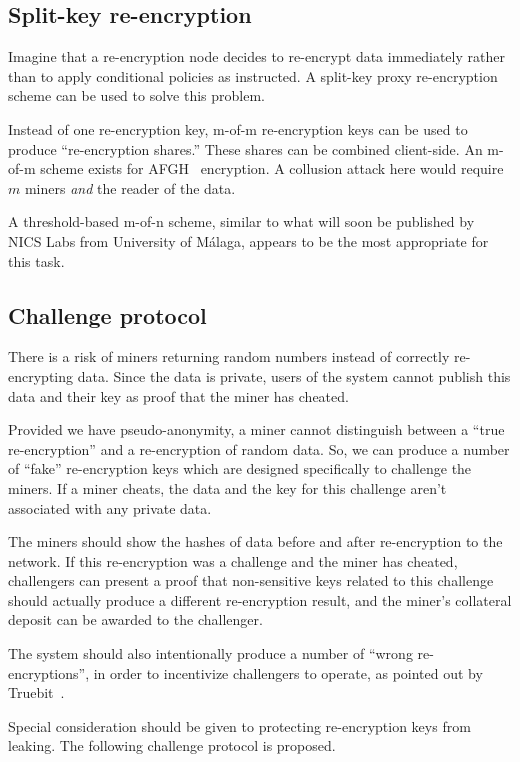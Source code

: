 \documentclass[longbibliography,nofootinbib]{revtex4-1}
\begin{document}
\subsection{Split-key re-encryption}

Imagine that a re-encryption node decides to re-encrypt data immediately rather than to apply conditional policies as instructed.
A split-key proxy re-encryption scheme can be used to solve this problem.

Instead of one re-encryption key, m-of-m re-encryption keys can be used to produce ``re-encryption shares.''
These shares can be combined client-side.
An m-of-m scheme exists for AFGH~\cite{AFGH} encryption.
A collusion attack here would require $m$ miners \emph{and} the reader of the data.

A threshold-based m-of-n scheme, similar to what will soon be published by NICS Labs from University of M{\'a}laga, appears to be the most appropriate for this task.

\subsection{Challenge protocol}
\label{sec:challenge-protocol}

There is a risk of miners returning random numbers instead of correctly re-encrypting data.
Since the data is private, users of the system cannot publish this data and their key as proof that the miner has cheated.

Provided we have pseudo-anonymity, a miner cannot distinguish between a ``true re-encryption'' and a re-encryption of random data.
So, we can produce a number of ``fake'' re-encryption keys which are designed specifically to challenge the miners.
If a miner cheats, the data and the key for this challenge aren't associated with any private data.

The miners should show the hashes of data before and after re-encryption to the network.
If this re-encryption was a challenge and the miner has cheated, challengers can present a proof that non-sensitive keys related to this challenge should actually
produce a different re-encryption result, and the miner's collateral deposit can be awarded to the challenger.

The system should also intentionally produce a number of ``wrong re-encryptions'', in order to incentivize challengers to operate, as pointed out by
Truebit~\cite{truebit}.

Special consideration should be given to protecting re-encryption keys from leaking.
The following challenge protocol is proposed.
\end{document}
